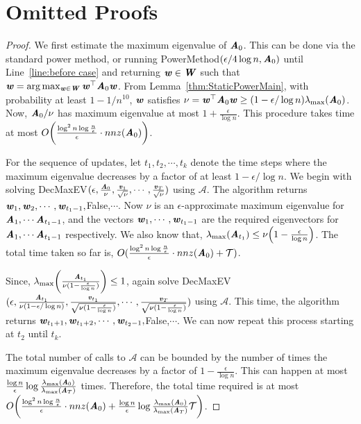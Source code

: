 
\section{Omitted Proofs}
\Decision*
\begin{proof}
We first estimate the maximum eigenvalue of $\AA_0$. This can be done via the standard power method, or running {\sc PowerMethod}$(\epsilon/4\log n, \AA_0)$ until Line~\ref{line:before case} and returning $\ww\in \WW$ such that $\ww= \arg\max_{\ww\in \WW}\ww^{\top}\AA_0\ww$. From Lemma~\ref{thm:StaticPowerMain}, with probability at least $1-1/n^{10}$, $\ww$ satisfies $\nu = \ww^{\top}\AA_0\ww\geq (1-\epsilon/\log n)\lambda_{\max}(\AA_0)$. Now, $\AA_0/\nu$ has maximum eigenvalue at most $1+\frac{\epsilon}{\log n}$. This procedure takes time at most $O\left(\frac{\log^2 n\log\frac{n}{\epsilon}}{\epsilon}\cdot nnz(\AA_0)\right)$.

   For the sequence of updates, let $t_1,t_2,\cdots,t_k$ denote the time steps where the maximum eigenvalue decreases by a factor of at least $1-\epsilon/\log n$. We begin with solving {\sc DecMaxEV}$(\epsilon,\frac{\AA_0}{\nu},\frac{\vv_1}{\sqrt{\nu}},\cdots, \frac{\vv_T}{\sqrt{\nu}})$ using $\mathcal{A}$.  The algorithm returns $\ww_1,\ww_2,\cdots,\ww_{t_1-1},${\sc False},$\cdots$. Now $\nu$ is an $\epsilon$-approximate maximum eigenvalue for $\AA_1,\cdots \AA_{t_1-1}$, and the vectors $\ww_1,\cdots,\ww_{t_1-1}$ are the required eigenvectors for $\AA_1,\cdots \AA_{t_1-1}$ respectively. We also know that, $\lambda_{\max}(\AA_{t_1})\leq \nu\left(1-\frac{\epsilon}{\log n}\right)$. The total time taken so far is, $O(\frac{\log^2 n\log\frac{n}{\epsilon}}{\epsilon}\cdot nnz(\AA_0) + \mathcal{T})$. 

   Since, $\lambda_{\max}\left(\frac{\AA_{t_1}}{\nu(1-\frac{\epsilon}{\log n})}\right)\leq 1$, again solve {\sc DecMaxEV}$(\epsilon,\frac{\AA_{t_1}}{\nu(1-\epsilon/\log n)},\frac{\vv_{t_1}}{\sqrt{\nu(1-\frac{\epsilon}{\log n})}},\cdots, \frac{\vv_T}{\sqrt{\nu(1-\frac{\epsilon}{\log n})}})$ using $\mathcal{A}$. This time, the algorithm returns $\ww_{t_1+1},\ww_{t_1+2},\cdots, \ww_{t_2-1},${\sc False},$\cdots$. We can now repeat this process starting at $t_2$ until $t_k$.

   The total number of calls to $\mathcal{A}$ can be bounded by the number of times the maximum eigenvalue decreases by a factor of $1-\frac{\epsilon}{\log n}$. This can happen at most $\frac{\log n}{\epsilon}\log \frac{\lambda_{\max}(\AA_0)}{\lambda_{\max}(\AA_T)}$ times. Therefore, the total time required is at most $O\left(\frac{\log^2 n\log\frac{n}{\epsilon}}{\epsilon}\cdot nnz(\AA_0) + \frac{\log n}{\epsilon}\log \frac{\lambda_{\max}(\AA_0)}{\lambda_{\max}(\AA_T)}\mathcal{T}\right)$.
\end{proof}

